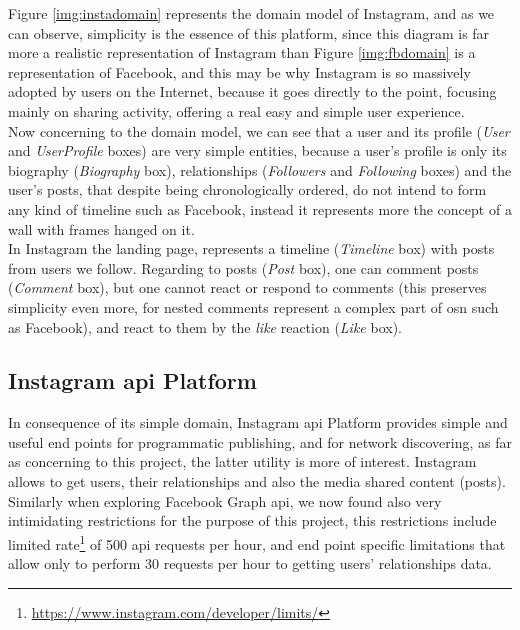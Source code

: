 Figure \ref{img:instadomain} represents the domain model of Instagram, and as we can observe, simplicity is the essence of this platform, since this diagram is far
more a realistic representation of Instagram than Figure \ref{img:fbdomain} is a representation of Facebook, and this may be why Instagram is so massively adopted by users
on the Internet, because it goes directly to the point, focusing mainly on sharing activity, offering a real easy and simple user experience.\\
\indent Now concerning to the domain model, we can see that a user and its profile (\textit{User} and \textit{UserProfile} boxes) are very simple entities, because
a user's profile is only its biography (\textit{Biography} box), relationships (\textit{Followers} and \textit{Following} boxes) and the user's posts, that despite
being chronologically ordered, do not intend to form any kind of timeline such as Facebook, instead it represents more the concept of a wall with frames hanged on it.\\
\indent In Instagram the landing page, represents a timeline (\textit{Timeline} box) with posts from users we follow. Regarding to posts (\textit{Post} box), one can
comment posts (\textit{Comment} box), but one cannot react or respond to comments (this preserves simplicity even more, for nested comments represent
 a complex part of \gls{osn} such as Facebook), and react to them by the \textit{like} reaction (\textit{Like} box).

\subsection*{Instagram \gls{api} Platform}
In consequence of its simple domain, Instagram \gls{api} Platform provides simple and useful
end points for programmatic publishing, and for network discovering, as far as concerning to this project, the latter utility
is more of interest. Instagram allows to get users, their relationships and also the media shared content (posts).\\
\indent Similarly when exploring Facebook Graph \gls{api}, we now found also very intimidating restrictions for the purpose of this project,
this restrictions include limited rate\footnote{\url{https://www.instagram.com/developer/limits/}} of 500 \gls{api} requests per hour, and end point specific limitations that allow only to
perform 30 requests per hour to getting users' relationships data.

